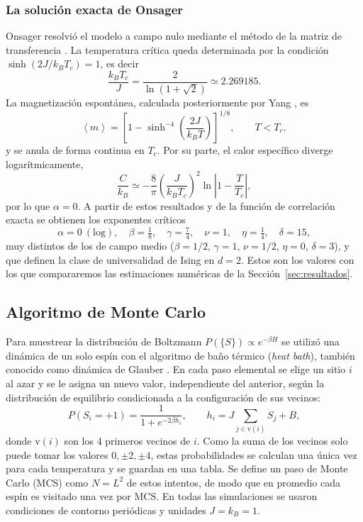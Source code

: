\documentclass[a4paper,11pt]{article}
\newcommand{\expval}[1]{\left\langle #1 \right\rangle}
\newcommand{\Tc}{T_c}
\begin{document}
\subsubsection{La solución exacta de Onsager}
Onsager resolvió el modelo a campo nulo mediante el método de la matriz de transferencia \cite{Onsager1944}.
La temperatura crítica queda determinada por la condición $\sinh(2J/k_B\Tc) = 1$, es decir
\begin{equation}
  \frac{k_B \Tc}{J} = \frac{2}{\ln\left(1 + \sqrt{2}\right)} \simeq 2.269185 .
\end{equation}
La magnetización espontánea, calculada posteriormente por Yang \cite{yangSpontaneousMagnetizationTwoDimensional1952}, es
\begin{equation}
  \expval{m} = \left[ 1 - \sinh^{-4}\left( \frac{2J}{k_B T} \right) \right]^{1/8}, \qquad T < \Tc ,
\end{equation}
y se anula de forma continua en $\Tc$.
Por su parte, el calor específico diverge logarítmicamente,
\begin{equation}
  \frac{C}{k_B} \simeq -\frac{8}{\pi} \left( \frac{J}{k_B \Tc} \right)^2 \ln\left| 1 - \frac{T}{\Tc} \right| ,
\end{equation}
por lo que $\alpha = 0$.
A partir de estos resultados y de la función de correlación exacta se obtienen los exponentes críticos
\begin{equation}
  \alpha = 0 \ (\text{log}), \quad \beta = \tfrac{1}{8}, \quad \gamma = \tfrac{7}{4}, \quad \nu = 1, \quad \eta = \tfrac{1}{4}, \quad \delta = 15 ,
\end{equation}
muy distintos de los de campo medio ($\beta = 1/2$, $\gamma = 1$, $\nu = 1/2$, $\eta = 0$, $\delta = 3$), y que definen la clase de universalidad de Ising en $d = 2$.
Estos son los valores con los que compararemos las estimaciones numéricas de la Sección~\ref{sec:resultados}.

\subsection{Algoritmo de Monte Carlo}
\label{sec:algoritmo}
Para muestrear la distribución de Boltzmann $P(\{S\}) \propto e^{-\beta H}$ se utilizó una dinámica de un solo espín con el algoritmo de baño térmico (\emph{heat bath}), también conocido como dinámica de Glauber \cite{landauGuideMonteCarlo2020}.
En cada paso elemental se elige un sitio $i$ al azar y se le asigna un nuevo valor, independiente del anterior, según la distribución de equilibrio condicionada a la configuración de sus vecinos:
\begin{equation}
  P(S_i = +1) = \frac{1}{1 + e^{-2\beta h_i}} , \qquad h_i = J \sum_{j \in \mathrm{v}(i)} S_j + B ,
  \label{eq:heatbath}
\end{equation}
donde $\mathrm{v}(i)$ son los 4 primeros vecinos de $i$.
Como la suma de los vecinos solo puede tomar los valores $0, \pm 2, \pm 4$, estas probabilidades se calculan una única vez para cada temperatura y se guardan en una tabla.
Se define un paso de Monte Carlo (MCS) como $N = L^2$ de estos intentos, de modo que en promedio cada espín es visitado una vez por MCS.
En todas las simulaciones se usaron condiciones de contorno periódicas y unidades $J = k_B = 1$.
\end{document}
